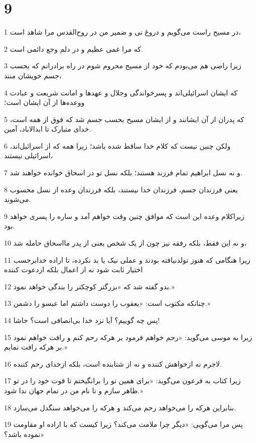 \chapter{9}

\par 1 در مسیح راست می‌گویم و دروغ نی و ضمیر من در روح‌القدس مرا شاهد است،
\par 2 که مرا غمی عظیم و در دلم وجع دائمی است.
\par 3 زیرا راضی هم می‌بودم که خود از مسیح محروم شوم در راه برادرانم که بحسب جسم خویشان منند،
\par 4 که ایشان اسرائیلی‌اند و پسرخواندگی وجلال و عهدها و امانت شریعت و عبادت ووعده‌ها از آن ایشان است؛
\par 5 که پدران از آن ایشانند و از ایشان مسیح بحسب جسم شد که فوق از همه است، خدای متبارک تا ابدالاباد، آمین.
\par 6 ولکن چنین نیست که کلام خدا ساقط شده باشد؛ زیرا همه که از اسرائیل‌اند، اسرائیلی نیستند،
\par 7 و نه نسل ابراهیم تمام فرزند هستند؛ بلکه نسل تو در اسحاق خوانده خواهند شد.
\par 8 یعنی فرزندان جسم، فرزندان خدا نیستند، بلکه فرزندان وعده از نسل محسوب می‌شوند.
\par 9 زیراکلام وعده این است که موافق چنین وقت خواهم آمد و ساره را پسری خواهد بود.
\par 10 و نه این فقط، بلکه رفقه نیز چون از یک شخص یعنی از پدر مااسحاق حامله شد،
\par 11 زیرا هنگامی که هنوز تولدنیافته بودند و عملی نیک یا بد نکرده، تا اراده خدابرحسب اختیار ثابت شود نه از اعمال بلکه ازدعوت کننده
\par 12 بدو گفته شد که «بزرگتر کوچکتر را بندگی خواهد نمود.»
\par 13 چنانکه مکتوب است: «یعقوب را دوست داشتم اما عیسو را دشمن.»
\par 14 پس چه گوییم؟ آیا نزد خدا بی‌انصافی است؟ حاشا!
\par 15 زیرا به موسی می‌گوید: «رحم خواهم فرمود بر هر‌که رحم کنم و رافت خواهم نمود بر هر‌که رافت نمایم.»
\par 16 لاجرم نه ازخواهش کننده و نه از شتابنده است، بلکه ازخدای رحم کننده.
\par 17 زیرا کتاب به فرعون می‌گوید: «برای همین تو را برانگیختم تا قوت خود را در تو ظاهر سازم و تا نام من در تمام جهان ندا شود.»
\par 18 بنابراین هر‌که را می‌خواهد رحم می‌کند و هر‌که را می‌خواهد سنگدل می‌سازد.
\par 19 پس مرا می‌گویی: «دیگر چرا ملامت می‌کند؟ زیرا کیست که با اراده او مقاومت نموده باشد؟»
